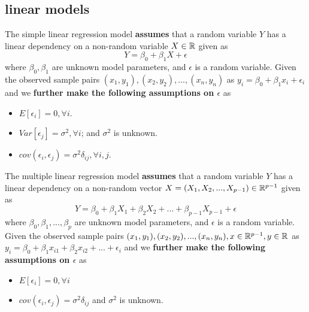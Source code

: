\begin{refsection}
\subsection{linear models}
\begin{definition}
	The simple linear regression model \textbf{assumes} that a random variable $Y$ has a linear dependency on a non-random variable $X \in \mathbb{R}$ given as
	$$Y = \beta_0 + \beta_1 X + \epsilon$$
	where $\beta_0,\beta_1$ are unknown model parameters, and $\epsilon$ is a random variable. 
	Given the observed sample pairs $(x_1,y_1),(x_2,y_2),..., (x_n,y_n)$ as $y_i = \beta_0 + \beta_1 x_i + \epsilon_i$ and we \textbf{further make the following assumptions on $\epsilon$} as
	\begin{itemize}
		\item $E[\epsilon_i] = 0,\forall i$.
		\item $Var[\epsilon_j] = \sigma^2,\forall i$; and $\sigma^2$ is unknown.
		\item $cov(\epsilon_i,\epsilon_j) =\sigma^2 \delta_{ij},\forall i,j$.
	\end{itemize} 	
\end{definition}


\begin{definition}\label{ch:statistical-models:def:multipleLinearRegressionModel}
	The multiple linear regression model \textbf{assumes} that a random variable $Y$ has a linear dependency on a non-random vector $X = (X_1,X_2,...,X_{p-1}) \in \mathbb{R}^{p-1}$ given as
	$$Y = \beta_0 + \beta_1 X_1 +\beta_2 X_2 + ... +\beta_{p-1} X_{p-1} + \epsilon$$
	where $\beta_0,\beta_1, ...,\beta_p$ are unknown model parameters, and $\epsilon$ is a random variable. 
	Given the observed sample pairs $(x_1,y_1),(x_2,y_2),..., (x_n,y_n), x\in \mathbb{R}^{p-1}, y\in \mathbb{R}$ as $y_i = \beta_0 + \beta_1 x_{i1} + \beta_2 x_{i2} + ... + \epsilon_i$ and we \textbf{further make the following assumptions on $\epsilon$} as
	\begin{itemize}
		\item $E[\epsilon_i] = 0,\forall i$
		\item $cov(\epsilon_i,\epsilon_j) = \sigma^2\delta_{ij}$ and $\sigma^2$ is unknown.
	\end{itemize} 	
\end{definition}


\end{refsection}

